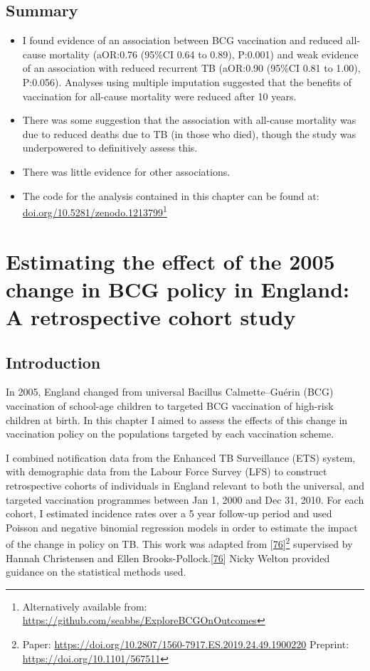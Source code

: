 \documentclass[11pt,twoside]{bristolthesis}
\begin{document}
  \hypertarget{summary-5}{%
  \section{Summary}\label{summary-5}}
  \begin{itemize}
  \item
    I found evidence of an association between BCG vaccination and reduced all-cause mortality (aOR:0.76 (95\%CI 0.64 to 0.89), P:0.001) and weak evidence of an association with reduced recurrent TB (aOR:0.90 (95\%CI 0.81 to 1.00), P:0.056). Analyses using multiple imputation suggested that the benefits of vaccination for all-cause mortality were reduced after 10 years.
  \item
    There was some suggestion that the association with all-cause mortality was due to reduced deaths due to TB (in those who died), though the study was underpowered to definitively assess this.
  \item
    There was little evidence for other associations.
  \item
    The code for the analysis contained in this chapter can be found at: \url{doi.org/10.5281/zenodo.1213799}\footnote{Alternatively available from: \url{https://github.com/seabbs/ExploreBCGOnOutcomes}}
  \end{itemize}
  \hypertarget{direct-eff}{%
  \chapter{Estimating the effect of the 2005 change in BCG policy in England: A retrospective cohort study}\label{direct-eff}}
  
  \hypertarget{introduction-5}{%
  \section{Introduction}\label{introduction-5}}
  
  In 2005, England changed from universal Bacillus Calmette--Guérin (BCG) vaccination of school-age children to targeted BCG vaccination of high-risk children at birth. In this chapter I aimed to assess the effects of this change in vaccination policy on the populations targeted by each vaccination scheme.
  
  I combined notification data from the Enhanced TB Surveillance (ETS) system, with demographic data from the Labour Force Survey (LFS) to construct retrospective cohorts of individuals in England relevant to both the universal, and targeted vaccination programmes between Jan 1, 2000 and Dec 31, 2010. For each cohort, I estimated incidence rates over a 5 year follow-up period and used Poisson and negative binomial regression models in order to estimate the impact of the change in policy on TB. This work was adapted from {[}\protect\hyperlink{ref-Abbott567511}{76}{]}\footnote{Paper: \url{https://doi.org/10.2807/1560-7917.ES.2019.24.49.1900220} Preprint: \url{https://doi.org/10.1101/567511}} supervised by Hannah Christensen and Ellen Brooks-Pollock.{[}\protect\hyperlink{ref-Abbott567511}{76}{]} Nicky Welton provided guidance on the statistical methods used.
  
\end{document}

